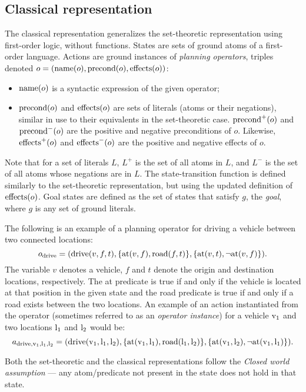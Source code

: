 \subsection{Classical representation}

The classical representation generalizes the set-theoretic representation using first-order logic,
without functions.
States are sets of ground atoms of a first-order language.
Actions are ground instances of \textit{planning operators},
triples denoted $o = (\operatorname{\textrm{name}}(o), \operatorname{\textrm{precond}}(o), \operatorname{\textrm{effects}}(o))$:

\begin{itemize}
\item $\operatorname{\textrm{name}}(o)$ is a syntactic expression of the given operator;
\item $\operatorname{\textrm{precond}}(o)$ and $\operatorname{\textrm{effects}}(o)$ are sets of literals
(atoms or their negations), similar in use to their equivalents
in the set-theoretic case. $\operatorname{\textrm{precond}}^+(o)$ and $\operatorname{\textrm{precond}}^-(o)$
are the positive and negative preconditions of $o$. Likewise,
$\operatorname{\textrm{effects}}^+(o)$ and $\operatorname{\textrm{effects}}^-(o)$ are the positive and negative effects of $o$. 
\end{itemize}
Note that for a set of literals $L$, $L^+$ is the set of all atoms in $L$,
and $L^-$ is the set of all atoms whose negations are in $L$.
The state-transition function is defined similarly to the set-theoretic
representation, but using the updated definition of $\operatorname{\textrm{effects}}(o)$.
Goal states are defined as the set of states that satisfy $g$,
the \textit{goal}, where $g$ is any set of ground literals.

The following is an example of a planning operator for driving a vehicle between two connected locations:
$$o_{\textrm{drive}} = (\textrm{drive}(v, f, t), \{\textrm{at}(v, f), \textrm{road}(f, t)\}, \{\textrm{at}(v, t), \neg \textrm{at}(v, f)\}).$$
The variable $v$ denotes a vehicle, $f$ and $t$ denote the origin and destination locations, respectively. The at predicate is true if and only if the vehicle is located at that position in the given state and the road predicate
is true if and only if a road exists between the two locations.
An example of an action instantiated from the operator (sometimes referred to as an \textit{operator instance})
for a vehicle $\textrm{v}_1$ and two locations $\textrm{l}_1$ and $\textrm{l}_2$ would be:
$$a_{\textrm{drive}, \textrm{v}_1, \textrm{l}_1, \textrm{l}_2} = (\textrm{drive}(\textrm{v}_1, \textrm{l}_1, \textrm{l}_2), \{\textrm{at}(\textrm{v}_1, \textrm{l}_1),
\textrm{road}(\textrm{l}_1, \textrm{l}_2)\}, \{\textrm{at}(\textrm{v}_1, \textrm{l}_2), \neg \textrm{at}(\textrm{v}_1, \textrm{l}_1)\}).$$


Both the set-theoretic and the classical representations follow the \textit{Closed world assumption} --- any atom/predicate not present in the state does not hold in that state.

